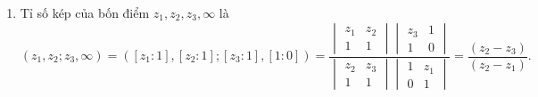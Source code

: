 \begin{exam*}
\begin{enumerate}
    \item Tỉ số kép của bốn điểm $z_1,z_2,z_3,\infty$ là 
        \[(z_1,z_2;z_3,\infty) = ([z_1:1],[z_2:1];[z_3:1],[1:0])=\dfrac{\begin{vmatrix}
         z_1 & z_2\\
         1 & 1
    \end{vmatrix}\begin{vmatrix}
         z_3 & 1\\
         1 & 0
    \end{vmatrix}}{\begin{vmatrix}
         z_2 & z_3\\
         1 & 1
    \end{vmatrix}\begin{vmatrix}
         1 & z_1\\
         0 & 1
    \end{vmatrix}} = \dfrac{(z_2-z_3)}{(z_2-z_1)}.\]
    \end{enumerate}
\end{exam*}

